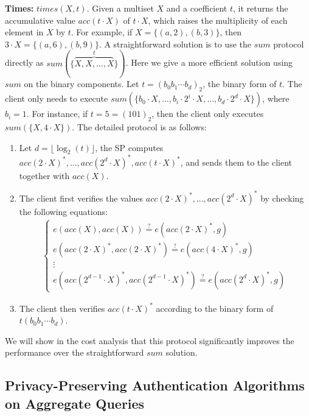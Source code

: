 \textbf{Times:} $times(X, t)$.
Given a multiset $X$ and a coefficient $t$, it returns the accumulative value $acc(t \cdot X)$ of $t \cdot X$, which raises the multiplicity of each element in $X$ by $t$. For example, if $X = \{(a, 2), (b, 3)\}$, then $3\cdot X = \{(a, 6), (b, 9)\}$. A straightforward solution is to use the $sum$ protocol directly as $sum(\{\overbrace{X, X, \dots, X}^{t}\})$. Here we give a more efficient solution using $sum$ on the binary components. Let $t = {(b_0b_1\cdots b_d)}_2$, the binary form of $t$. The client only needs to execute $sum(\{b_0 \cdot X, \dots, b_i \cdot 2^i \cdot X, \dots, b_d \cdot 2^d \cdot X\})$, where $b_i=1$. For instance, if $t = 5={(101)}_2$, then the client only executes $sum(\{X, 4\cdot X\})$. The detailed protocol is as follows:
\begin{enumerate}
  \item Let $d = \lfloor \log_2(t) \rfloor$, the SP computes ${acc(2\cdot X)}^*, \dots, {acc({2^d} \cdot X)}^*, {acc(t \cdot X)}^*$, and sends them to the client together with $acc(X)$.
  \item The client first verifies the values ${acc(2\cdot X)}^*, \dots, {acc({2^d} \cdot X)}^*$ by checking the following equations:
    \begin{align*}
      \left \{
        \begin{array}{l}
          e(acc(X), acc(X)) \stackrel{?}{=} e({acc(2\cdot X)}^*, g)\\
          e({acc(2\cdot X)}^*, {acc(2\cdot X)}^*) \stackrel{?}{=} e({acc(4 \cdot X)}^*, g) \\
          \vdots\\
          e({acc(2^{d-1} \cdot X)}^*, {acc(2^{d-1} \cdot X)}^*) \stackrel{?}{=} e({acc({2^d} \cdot X)}^*, g)
        \end{array}
      \right.
    \end{align*}
  \item The client then verifies ${acc(t \cdot X)}^*$ according to the binary form of $t(b_0b_1\cdots b_d)$.
\end{enumerate}

We will show in the cost analysis that this protocol significantly improves the performance over the straightforward $sum$ solution.

\subsection{Privacy-Preserving Authentication Algorithms on Aggregate Queries}

